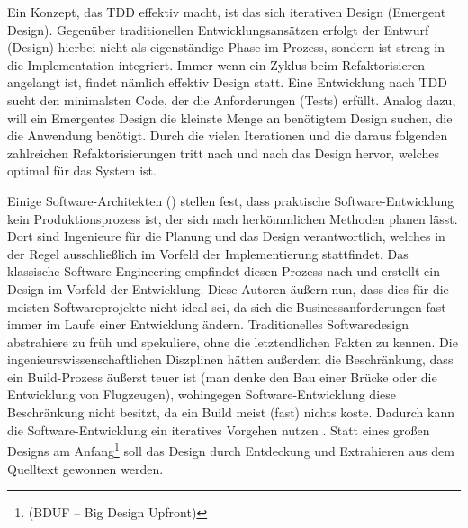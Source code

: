 Ein Konzept, das TDD effektiv macht, ist das sich iterativen Design (Emergent Design). Gegenüber traditionellen Entwicklungsansätzen erfolgt der Entwurf (Design) hierbei nicht als eigenständige Phase im Prozess, sondern ist streng in die Implementation integriert. Immer wenn ein Zyklus beim Refaktorisieren angelangt ist, findet nämlich effektiv Design statt. Eine Entwicklung nach TDD sucht den minimalsten Code, der die Anforderungen (Tests) erfüllt. Analog dazu, will ein Emergentes Design die kleinste Menge an benötigtem Design suchen, die die Anwendung benötigt. Durch die vielen Iterationen und die daraus folgenden zahlreichen Refaktorisierungen tritt nach und nach das Design hervor, welches optimal für das System ist.


Einige Software-Architekten (\cite{neal_ford_emergent_2010,jack_reeves_three_1992,glenn_vanderburg_real_2010}) stellen fest, dass praktische Software\hyp{}Entwicklung kein Produktionsprozess ist, der sich nach herkömmlichen Methoden planen lässt. Dort sind Ingenieure für die Planung und das Design verantwortlich, welches in der Regel ausschließlich im Vorfeld der Implementierung stattfindet. Das klassische Software-Engineering empfindet diesen Prozess nach und erstellt ein Design im Vorfeld der Entwicklung. Diese Autoren äußern nun, dass dies für die meisten Softwareprojekte nicht ideal sei, da sich die Businessanforderungen fast immer im Laufe einer Entwicklung ändern. Traditionelles Softwaredesign abstrahiere zu früh und spekuliere, ohne die letztendlichen Fakten zu kennen. Die ingenieurswissenschaftlichen Diszplinen hätten außerdem die Beschränkung, dass ein Build-Prozess äußerst teuer ist (man denke den Bau einer Brücke oder die Entwicklung von Flugzeugen), wohingegen Software-Entwicklung diese Beschränkung nicht besitzt, da ein Build meist (fast) nichts koste. Dadurch kann die Software-Entwicklung ein iteratives Vorgehen nutzen \cite{neal_ford_emergent_2010,glenn_vanderburg_real_2010,jack_reeves_three_1992}. Statt eines großen Designs am Anfang\footnote{(BDUF -- Big Design Upfront)} soll das Design durch Entdeckung und Extrahieren aus dem Quelltext gewonnen werden.


